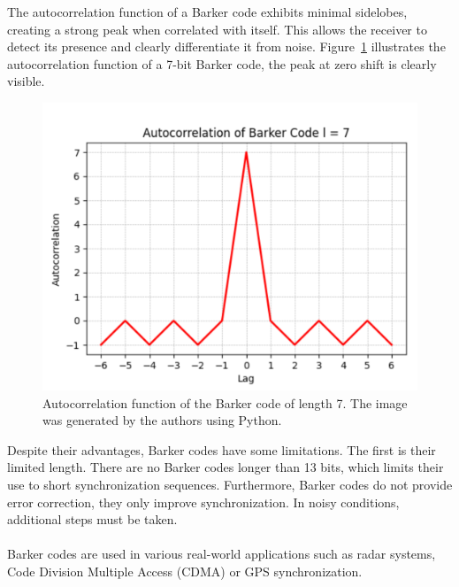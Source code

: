 The autocorrelation function of a Barker code exhibits minimal sidelobes, creating a strong peak when correlated with itself. This allows the receiver to detect its presence and clearly differentiate it from noise. Figure~\ref{fig:barker_code} illustrates the autocorrelation function of a 7-bit Barker code, the peak at zero shift is clearly visible.
\begin{figure}[h]
    \centering
    \includegraphics[scale=0.45]{images/ugly_barker_code.PNG}
    \caption{Autocorrelation function of the Barker code of length 7. The image was generated by the authors using Python.}
    \label{fig:barker_code}
\end{figure}
Despite their advantages, Barker codes have some limitations. The first is their limited length. There are no Barker codes longer than 13 bits, which limits their use to short synchronization sequences. Furthermore, Barker codes do not provide error correction, they only improve synchronization. In noisy conditions, additional steps must be taken.
\\ \\
Barker codes are used in various real-world applications such as radar systems, Code Division Multiple Access (CDMA) or GPS synchronization.

